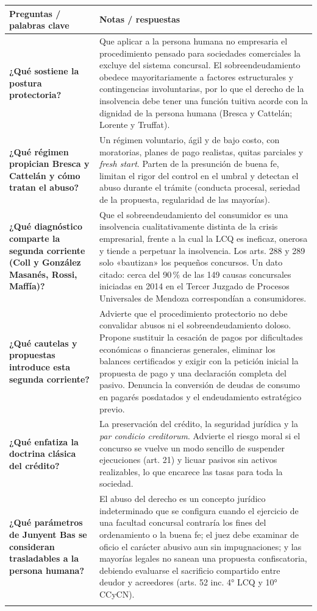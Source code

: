 \documentclass[12pt,oneside]{book}
\makeatletter
\newcommand{\cornellrow}[2]{\textbf{#1} & #2 \\ \addlinespace[0.8em]}
\newenvironment{cornell}[1]{%
    \par\medskip
    \noindent{\large\bfseries Cuadro Cornell --- #1}\par\smallskip
    \begin{longtable}{@{}>{\raggedright\arraybackslash}p{0.25\textwidth}>{\raggedright\arraybackslash}p{0.69\textwidth}@{}}
    \toprule
    \textbf{Preguntas / palabras clave} & \textbf{Notas / respuestas} \\
    \midrule
    \endhead
}{%
    \bottomrule
    \end{longtable}
}
\makeatother
\begin{document}
\begin{cornell}{Doctrina}
\cornellrow{¿Qué sostiene la postura protectoria?}{Que aplicar a la persona humana no empresaria el procedimiento pensado para sociedades comerciales la excluye del sistema concursal. El sobreendeudamiento obedece mayoritariamente a factores estructurales y contingencias involuntarias, por lo que el derecho de la insolvencia debe tener una función tuitiva acorde con la dignidad de la persona humana (Bresca y Cattelán; Lorente y Truffat).}
\cornellrow{¿Qué régimen propician Bresca y Cattelán y cómo tratan el abuso?}{Un régimen voluntario, ágil y de bajo costo, con moratorias, planes de pago realistas, quitas parciales y \textit{fresh start}. Parten de la presunción de buena fe, limitan el rigor del control en el umbral y detectan el abuso durante el trámite (conducta procesal, seriedad de la propuesta, regularidad de las mayorías).}
\cornellrow{¿Qué diagnóstico comparte la segunda corriente (Coll y González Masanés, Rossi, Maffía)?}{Que el sobreendeudamiento del consumidor es una insolvencia cualitativamente distinta de la crisis empresarial, frente a la cual la LCQ es ineficaz, onerosa y tiende a perpetuar la insolvencia. Los arts. 288 y 289 solo «bautizan» los pequeños concursos. Un dato citado: cerca del 90\,\% de las 149 causas concursales iniciadas en 2014 en el Tercer Juzgado de Procesos Universales de Mendoza correspondían a consumidores.}
\cornellrow{¿Qué cautelas y propuestas introduce esta segunda corriente?}{Advierte que el procedimiento protectorio no debe convalidar abusos ni el sobreendeudamiento doloso. Propone sustituir la cesación de pagos por dificultades económicas o financieras generales, eliminar los balances certificados y exigir con la petición inicial la propuesta de pago y una declaración completa del pasivo. Denuncia la conversión de deudas de consumo en pagarés posdatados y el endeudamiento estratégico previo.}
\cornellrow{¿Qué enfatiza la doctrina clásica del crédito?}{La preservación del crédito, la seguridad jurídica y la \textit{par condicio creditorum}. Advierte el riesgo moral si el concurso se vuelve un modo sencillo de suspender ejecuciones (art. 21) y licuar pasivos sin activos realizables, lo que encarece las tasas para toda la sociedad.}
\cornellrow{¿Qué parámetros de Junyent Bas se consideran trasladables a la persona humana?}{El abuso del derecho es un concepto jurídico indeterminado que se configura cuando el ejercicio de una facultad concursal contraría los fines del ordenamiento o la buena fe; el juez debe examinar de oficio el carácter abusivo aun sin impugnaciones; y las mayorías legales no sanean una propuesta confiscatoria, debiendo evaluarse el sacrificio compartido entre deudor y acreedores (arts. 52 inc. 4° LCQ y 10° CCyCN).}

\end{cornell}
\end{document}
